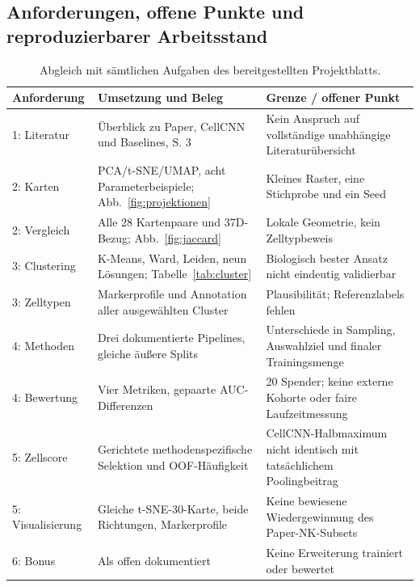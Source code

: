 \documentclass[11pt,a4paper]{article}
\begin{document}
\subsection*{Anforderungen, offene Punkte und reproduzierbarer Arbeitsstand}
\begin{table}[!ht]\centering\small
\caption{Abgleich mit sämtlichen Aufgaben des bereitgestellten Projektblatts.}
\begin{tabular}{p{2cm}p{6.7cm}p{6.2cm}}\toprule
Anforderung & Umsetzung und Beleg & Grenze / offener Punkt\\\midrule
1: Literatur & Überblick zu Paper, CellCNN und Baselines, S. 3 & Kein Anspruch auf vollständige unabhängige Literaturübersicht\\
2: Karten & PCA/t-SNE/UMAP, acht Parameterbeispiele; Abb.\ \ref{fig:projektionen} & Kleines Raster, eine Stichprobe und ein Seed\\
2: Vergleich & Alle 28 Kartenpaare und 37D-Bezug; Abb.\ \ref{fig:jaccard} & Lokale Geometrie, kein Zelltypbeweis\\
3: Clustering & K-Means, Ward, Leiden, neun Lösungen; Tabelle\ \ref{tab:cluster} & Biologisch bester Ansatz nicht eindeutig validierbar\\
3: Zelltypen & Markerprofile und Annotation aller ausgewählten Cluster & Plausibilität; Referenzlabels fehlen\\
4: Methoden & Drei dokumentierte Pipelines, gleiche äußere Splits & Unterschiede in Sampling, Auswahlziel und finaler Trainingsmenge\\
4: Bewertung & Vier Metriken, gepaarte AUC-Differenzen & 20 Spender; keine externe Kohorte oder faire Laufzeitmessung\\
5: Zellscore & Gerichtete methodenspezifische Selektion und OOF-Häufigkeit & CellCNN-Halbmaximum nicht identisch mit tatsächlichem Poolingbeitrag\\
5: Visualisierung & Gleiche t-SNE-30-Karte, beide Richtungen, Markerprofile & Keine bewiesene Wiedergewinnung des Paper-NK-Subsets\\
6: Bonus & Als offen dokumentiert & Keine Erweiterung trainiert oder bewertet\\
\bottomrule\end{tabular}
\end{table}
\end{document}
